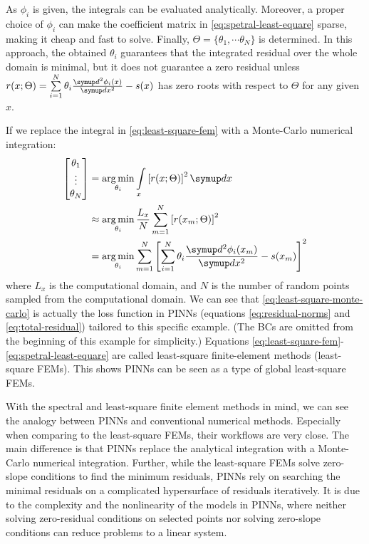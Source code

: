 As $\phi_i$ is given, the integrals can be evaluated analytically.
Moreover, a proper choice of $\phi_i$ can make the coefficient matrix in \eqref{eq:spetral-least-equare} sparse, making it cheap and fast to solve.
Finally, $\Theta=\{\theta_1,\cdots\theta_N\}$ is determined.
In this approach, the obtained $\theta_i$ guarantees that the integrated residual over the whole domain is minimal, but it does not guarantee a zero residual unless $r(x; \Theta) = \sum\limits_{i=1}^{N}\theta_i \frac{\diff^2 \phi_i(x)}{\diff x^2} - s(x)$ has zero roots with respect to $\Theta$ for any given $x$.

If we replace the integral in \eqref{eq:least-square-fem} with a Monte-Carlo numerical integration:
\begin{equation}\label{eq:least-square-monte-carlo}
    \begin{aligned}
        \begin{bmatrix}
            \theta_1 \\ \vdots \\ \theta_N
        \end{bmatrix}
        & =
        \operatorname*{arg\,min}\limits_{\theta_i}
        \int\limits_{x}\left[r(x; \Theta)\right]^2\diff x \\
        &\approx
        \operatorname*{arg\,min}\limits_{\theta_i}
        \frac{L_x}{N}\sum\limits_{m=1}^{N}\left[r(x_m; \Theta)\right]^2 \\
        & =
        \operatorname*{arg\,min}\limits_{\theta_i}
        \sum\limits_{m=1}^{N}\left[\sum\limits_{i=1}^{N}\theta_i \frac{\diff^2 \phi_i(x_m)}{\diff x^2} - s(x_m)\right]^2
    \end{aligned}
\end{equation}
where $L_x$ is the computational domain, and $N$ is the number of random points sampled from the computational domain.
We can see that \eqref{eq:least-square-monte-carlo} is actually the loss function in PINNs (equations \eqref{eq:residual-norms} and \eqref{eq:total-residual}) tailored to this specific example.
(The BCs are omitted from the beginning of this example for simplicity.)
Equations \eqref{eq:least-square-fem}-\eqref{eq:spetral-least-equare} are called least-square finite-element methods (least-square FEMs).
This shows PINNs can be seen as a type of global least-square FEMs.

With the spectral and least-square finite element methods in mind, we can see the analogy between PINNs and conventional numerical methods.
Especially when comparing to the least-square FEMs, their workflows are very close.
The main difference is that PINNs replace the analytical integration with a Monte-Carlo numerical integration.
Further, while the least-square FEMs solve zero-slope conditions to find the minimum residuals, PINNs rely on searching the minimal residuals on a complicated hypersurface of residuals iteratively.
It is due to the complexity and the nonlinearity of the models in PINNs, where neither solving zero-residual conditions on selected points nor solving zero-slope conditions can reduce problems to a linear system. 

